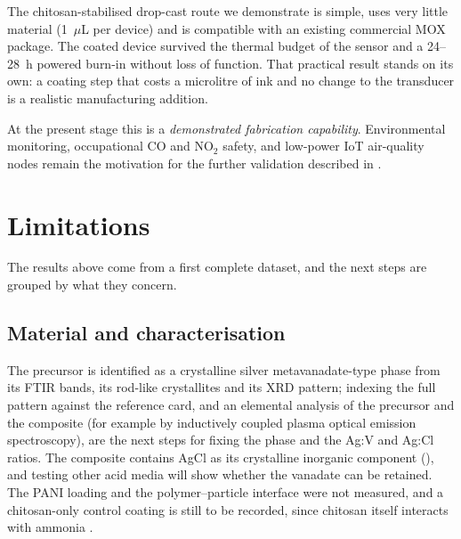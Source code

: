 \documentclass[preprint,11pt]{elsarticle}
\begin{document}
The chitosan-stabilised drop-cast route we demonstrate is simple, uses very little material (1~$\mu$L per device) and is compatible with an existing commercial MOX package. The coated device survived the thermal budget of the sensor and a 24--28~h powered burn-in without loss of function. That practical result stands on its own: a coating step that costs a microlitre of ink and no change to the transducer is a realistic manufacturing addition.

At the present stage this is a \emph{demonstrated fabrication capability}. Environmental monitoring, occupational CO and NO$_2$ safety, and low-power IoT air-quality nodes remain the motivation for the further validation described in .

\FloatBarrier
\section{Limitations}
\label{sec:limitations}
The results above come from a first complete dataset, and the next steps are grouped by what they concern.

\subsection{Material and characterisation}
The precursor is identified as a crystalline silver metavanadate-type phase from its FTIR bands, its rod-like crystallites and its XRD pattern; indexing the full pattern against the reference card, and an elemental analysis of the precursor and the composite (for example by inductively coupled plasma optical emission spectroscopy), are the next steps for fixing the phase and the Ag:V and Ag:Cl ratios. The composite contains AgCl as its crystalline inorganic component (), and testing other acid media will show whether the vanadate can be retained. The PANI loading and the polymer--particle interface were not measured, and a chitosan-only control coating is still to be recorded, since chitosan itself interacts with ammonia \cite{saeed2024chitosansal}.
\end{document}
